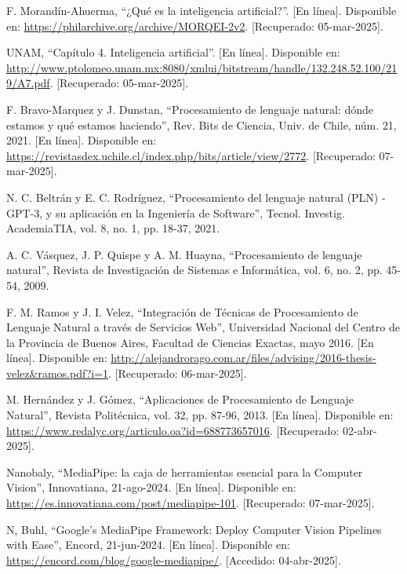 \begin{thebibliography}{200}
    F. Morandín-Ahuerma, “¿Qué es la inteligencia artificial?”. [En línea]. Disponible en: \url{https://philarchive.org/archive/MORQEI-2v2}. [Recuperado: 05-mar-2025].

    UNAM, “Capítulo 4. Inteligencia artificial”. [En línea]. Disponible en: \url{http://www.ptolomeo.unam.mx:8080/xmlui/bitstream/handle/132.248.52.100/219/A7.pdf}. [Recuperado: 05-mar-2025].

    F. Bravo-Marquez y J. Dunstan, “Procesamiento de lenguaje natural: dónde estamos y qué estamos haciendo”, Rev. Bits de Ciencia, Univ. de Chile, núm. 21, 2021. [En línea]. Disponible en: \url{https://revistasdex.uchile.cl/index.php/bits/article/view/2772}. [Recuperado: 07-mar-2025].
    
    N. C. Beltrán y E. C. Rodríguez, “Procesamiento del lenguaje natural (PLN) -GPT-3, y su aplicación en la Ingeniería de Software”, Tecnol. Investig. AcademiaTIA, vol. 8, no. 1, pp. 18-37, 2021.

    A. C. Vásquez, J. P. Quispe y A. M. Huayna, “Procesamiento de lenguaje natural”, Revista de Investigación de Sistemas e Informática, vol. 6, no. 2, pp. 45-54, 2009.

    F. M. Ramos y J. I. Velez, “Integración de Técnicas de Procesamiento de Lenguaje Natural a través de Servicios Web”, Universidad Nacional del Centro de la Provincia de Buenos Aires, Facultad de Ciencias Exactas, mayo 2016. [En línea]. Disponible en: \url{http://alejandrorago.com.ar/files/advising/2016-thesis-velez&ramos.pdf?i=1}. [Recuperado: 06-mar-2025].

    M. Hernández y J. Gómez, “Aplicaciones de Procesamiento de Lenguaje Natural”, Revista Politécnica, vol. 32, pp. 87-96, 2013. [En línea]. Disponible en: \url{https://www.redalyc.org/articulo.oa?id=688773657016}. [Recuperado: 02-abr-2025].

    Nanobaly, “MediaPipe: la caja de herramientas esencial para la Computer Vision”, Innovatiana, 21-ago-2024. [En línea]. Disponible en: \url{https://es.innovatiana.com/post/mediapipe-101}. [Recuperado: 07-mar-2025].

    N, Buhl, “Google’s MediaPipe Framework: Deploy Computer Vision Pipelines with Ease”, Encord, 21-jun-2024. [En línea]. Disponible en: \url{https://encord.com/blog/google-mediapipe/}. [Accedido: 04-abr-2025].


\end{thebibliography}
